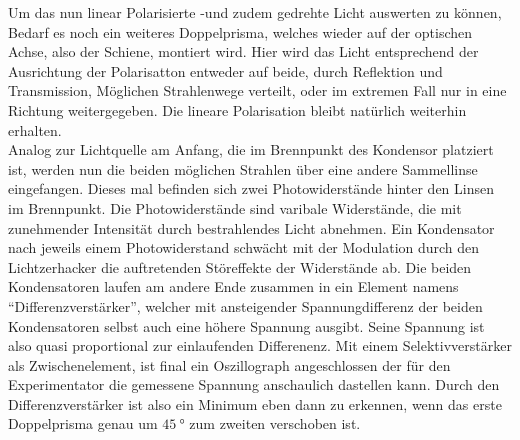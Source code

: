 \newline
Um das nun linear Polarisierte -und zudem gedrehte Licht auswerten zu können, Bedarf es noch ein weiteres Doppelprisma, welches wieder auf der optischen Achse, also der Schiene,
montiert wird. Hier wird das Licht entsprechend der Ausrichtung der Polarisatton entweder auf beide, durch Reflektion und Transmission,
Möglichen Strahlenwege verteilt, oder im extremen Fall nur in eine Richtung weitergegeben. Die lineare Polarisation bleibt natürlich weiterhin erhalten.
\\
\newline
Analog zur Lichtquelle am Anfang, die im Brennpunkt des Kondensor platziert ist, werden nun die beiden möglichen Strahlen
über eine andere Sammellinse eingefangen. Dieses mal befinden sich zwei Photowiderstände hinter den Linsen im Brennpunkt.
Die Photowiderstände sind varibale Widerstände, die mit zunehmender Intensität durch bestrahlendes Licht abnehmen.
Ein Kondensator nach jeweils einem Photowiderstand schwächt mit der Modulation durch den Lichtzerhacker die auftretenden Störeffekte 
der Widerstände ab. Die beiden Kondensatoren laufen am andere Ende zusammen in ein Element namens \enquote{Differenzverstärker},
welcher mit ansteigender Spannungdifferenz der beiden Kondensatoren selbst auch eine höhere Spannung ausgibt. Seine Spannung ist also 
quasi proportional zur einlaufenden Differenenz. Mit einem Selektivverstärker als Zwischenelement, ist final ein Oszillograph angeschlossen
der für den Experimentator die gemessene Spannung anschaulich dastellen kann. Durch den Differenzverstärker ist also ein Minimum eben dann zu erkennen, wenn das erste 
Doppelprisma genau um $\SI{45}{\degree}$ zum zweiten verschoben ist.